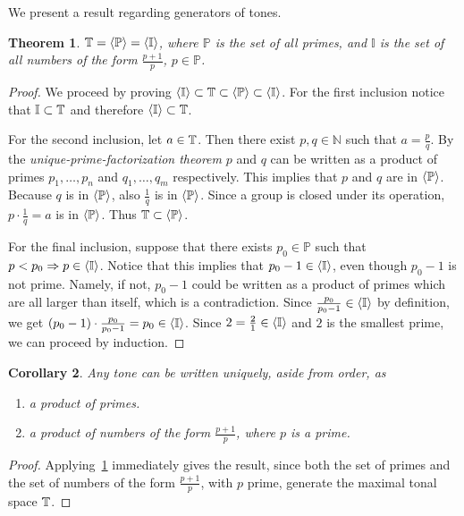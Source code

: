 \documentclass[a4paper]{book}
\newtheorem{theorem}{Theorem}[chapter]
\newtheorem{corollary}[theorem]{Corollary}
\theoremstyle{definition}
\begin{document}
We present a result regarding generators of tones.

\newcommand{\Primes}{\mathbb{P}}
\newcommand{\I}{\mathbb{I}}

\begin{theorem}
    $\Q = \gen{\Primes} = \gen{\I}$, where $\Primes$ is the set of all primes, and $\I$ is the set of all numbers of the form $\frac{p+1}{p}$, $p \in \Primes$.
    \label{thm_generator_equivalence}
\end{theorem}
\begin{proof}
    We proceed by proving $\gen{\I} \subset \Q \subset \gen{\Primes} \subset \gen{\I}$.
    For the first inclusion notice that $\I \subset \Q$ and therefore $\gen{\I} \subset \Q$.

    For the second inclusion, let $a \in \mathbb{T}$.
    Then there exist $p,q \in \mathbb{N}$ such that $a = \frac{p}{q}$.
    By the \emph{unique-prime-factorization theorem} $p$ and $q$ can be written as a product of primes $p_1,\dots,p_n$ and $q_1,\dots,q_m$ respectively.
    This implies that $p$ and $q$ are in $\gen{\Primes}$.
    Because $q$ is in $\gen{\Primes}$, also $\frac{1}{q}$ is in $\gen{\Primes}$.
    Since a group is closed under its operation, $p\cdot \frac{1}{q} = a$ is in $\gen{\Primes}$.
    Thus $\Q \subset \gen{\Primes}$.

    For the final inclusion, suppose that there exists $p_0 \in \Primes$ such that $p < p_0 \Rightarrow p \in \gen{\I}$.
    Notice that this implies that $p_0-1 \in \gen{\I}$, even though $p_0 -1$ is not prime.
    Namely, if not, $p_0 - 1$ could be written as a product of primes which are all larger than itself, which is a contradiction.
    Since $\frac{p_0}{p_0-1} \in \gen{\I}$ by definition, we get $(p_0 -1) \cdot \frac{p_0}{p_0-1} = p_0 \in \gen{\I}$.
    Since $2 = \frac{2}{1} \in \gen{\I}$ and $2$ is the smallest prime, we can proceed by induction.
\end{proof}

\begin{corollary}
    Any tone can be written uniquely, aside from order, as 
    \begin{enumerate}[i]
        \item a product of primes.
        \item a product of numbers of the form $\frac{p+1}{p}$, where $p$ is a prime.
    \end{enumerate}
\end{corollary}
\begin{proof}
    Applying~\ref{thm_generator_equivalence} immediately gives the result, since both the set of primes and the set of numbers of the form $\frac{p+1}{p}$, with $p$ prime, generate the maximal tonal space $\mathbb{T}$.
\end{proof}
\end{document}
